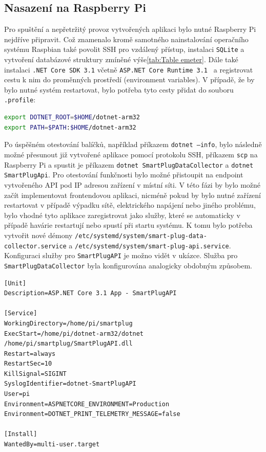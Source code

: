 \documentclass[czech,master,dept460,male,cpp,cpdeclaration,oneside]{diploma}
\begin{document}
\subsection{Nasazení na Raspberry Pi}
Pro spuštění a nepřetržitý provoz vytvořených aplikaci bylo nutné Raspberry Pi nejdříve připravit. Což znamenalo kromě samotného nainstalování operačního systému Raspbian také povolit SSH pro vzdálený přístup, instalaci \texttt{SQLite} a vytvoření databázové struktury zmíněné výše\ref{tab:Table emeter}. Dále také instalaci \texttt{.NET Core SDK 3.1} včetně \texttt{ASP.NET Core Runtime 3.1 } a registrovat cestu k nim do proměnných prostředí (environment variables). V případě, že by bylo nutné systém restartovat, bylo potřeba tyto cesty přidat do souboru \texttt{.profile}:
\bigbreak
\begin{lstlisting}[language=bash,caption=Proměnné prostředí pro cesty k .NET Core SDK a ASP.NET Runtime]
export DOTNET_ROOT=$HOME/dotnet-arm32
export PATH=$PATH:$HOME/dotnet-arm32
\end{lstlisting}
\bigbreak
Po úspěšném otestování balíčků, například příkazem \texttt{dotnet --info}, bylo následně možné přesunout již vytvořené aplikace pomocí protokolu SSH, příkazem \texttt{scp} na Raspberry Pi a spustit je příkazem \texttt{dotnet SmartPlugDataCollector} a \texttt{dotnet SmartPlugApi}. Pro otestování funkčnosti bylo možné přistoupit na endpoint vytvořeného API pod IP adresou zařízení v místní síti. V této fázi by bylo možné začít implementovat frontendovou aplikaci, nicméně pokud by bylo nutné zařízení restartovat v případě výpadku sítě, elektrického napájení nebo jiného problému, bylo vhodné tyto aplikace zaregistrovat jako služby, které se automaticky v případě havárie restartují nebo spustí při startu systému. K tomu bylo potřeba vytvořit nové démony \texttt{/etc/systemd/system/smart-plug-data-collector.service} a \texttt{/etc/systemd/system/smart-plug-api.service}. Konfiguraci služby pro \texttt{SmartPlugAPI} je možno vidět v ukázce. Služba pro \texttt{SmartPlugDataCollector} byla konfigurována analogicky obdobným způsobem. 
\bigbreak
\begin{lstlisting}[language={},caption=Konfigurace jedné z aplikací jako systémové služby]
[Unit]
Description=ASP.NET Core 3.1 App - SmartPlugAPI

[Service]
WorkingDirectory=/home/pi/smartplug
ExecStart=/home/pi/dotnet-arm32/dotnet /home/pi/smartplug/SmartPlugAPI.dll
Restart=always
RestartSec=10
KillSignal=SIGINT
SyslogIdentifier=dotnet-SmartPlugAPI
User=pi
Environment=ASPNETCORE_ENVIRONMENT=Production
Environment=DOTNET_PRINT_TELEMETRY_MESSAGE=false

[Install]
WantedBy=multi-user.target
\end{lstlisting}
\end{document}
